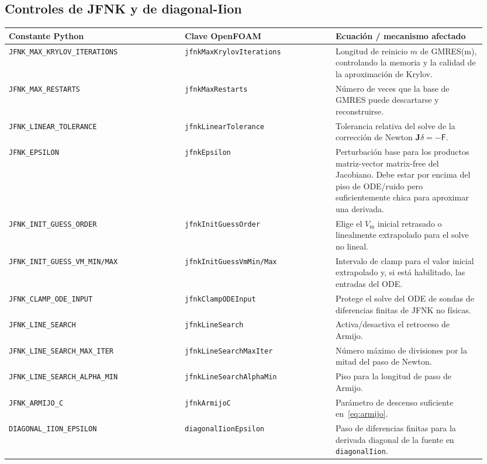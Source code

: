 \documentclass[11pt,a4paper]{article}
\newcommand{\code}[1]{\texttt{\small #1}}
\newcommand{\Vm}{V_{\text{m}}}
\newcommand{\Fres}{\mathsf{F}}
\begin{document}
\subsection{Controles de JFNK y de diagonal-Iion}
\begin{longtable}{@{}p{0.35\linewidth}p{0.30\linewidth}p{0.30\linewidth}@{}}
\toprule
Constante Python & Clave OpenFOAM & Ecuación / mecanismo afectado \\
\midrule \endhead
\code{JFNK\_MAX\_KRYLOV\_ITERATIONS} & \code{jfnkMaxKrylovIterations} &
   Longitud de reinicio $m$ de GMRES(m), controlando la memoria y la calidad de la
   aproximación de Krylov. \\
\code{JFNK\_MAX\_RESTARTS} & \code{jfnkMaxRestarts} &
   Número de veces que la base de GMRES puede descartarse y reconstruirse. \\
\code{JFNK\_LINEAR\_TOLERANCE} & \code{jfnkLinearTolerance} &
   Tolerancia relativa del solve de la corrección de Newton
   $\mathbf{J}\delta=-\Fres$. \\
\code{JFNK\_EPSILON} & \code{jfnkEpsilon} &
   Perturbación base para los productos matriz-vector matrix-free del Jacobiano.
   Debe estar por encima del piso de ODE/ruido pero suficientemente chica para
   aproximar una derivada. \\
\code{JFNK\_INIT\_GUESS\_ORDER} & \code{jfnkInitGuessOrder} &
   Elige el $\Vm$ inicial retrasado o linealmente extrapolado para el solve no
   lineal. \\
\code{JFNK\_INIT\_GUESS\_VM\_MIN/MAX} &
   \code{jfnkInitGuessVmMin/Max} &
   Intervalo de clamp para el valor inicial extrapolado y, si está habilitado, las
   entradas del ODE. \\
\code{JFNK\_CLAMP\_ODE\_INPUT} & \code{jfnkClampODEInput} &
   Protege el solve del ODE de sondas de diferencias finitas de JFNK no físicas. \\
\code{JFNK\_LINE\_SEARCH} & \code{jfnkLineSearch} &
   Activa/desactiva el retroceso de Armijo. \\
\code{JFNK\_LINE\_SEARCH\_MAX\_ITER} &
   \code{jfnkLineSearchMaxIter} &
   Número máximo de divisiones por la mitad del paso de Newton. \\
\code{JFNK\_LINE\_SEARCH\_ALPHA\_MIN} &
   \code{jfnkLineSearchAlphaMin} &
   Piso para la longitud de paso de Armijo. \\
\code{JFNK\_ARMIJO\_C} & \code{jfnkArmijoC} &
   Parámetro de descenso suficiente en~\eqref{eq:armijo}. \\
\code{DIAGONAL\_IION\_EPSILON} & \code{diagonalIionEpsilon} &
   Paso de diferencias finitas para la derivada diagonal de la fuente en
   \code{diagonalIion}. \\
\bottomrule
\end{longtable}
\end{document}
